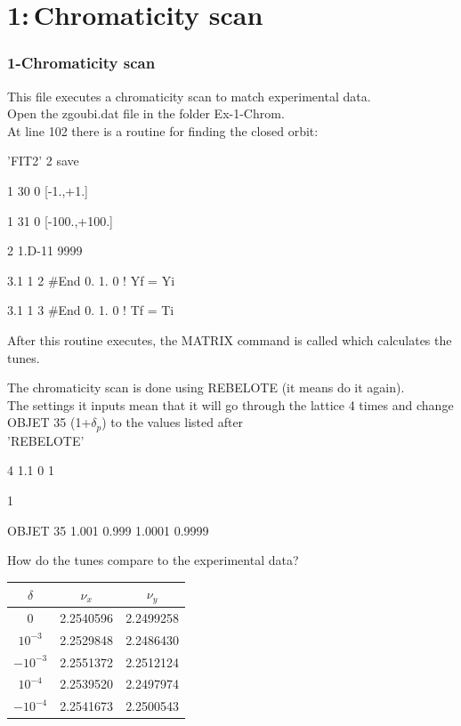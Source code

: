 \documentclass{beamer}
\begin{document}
\section{1:\,Chromaticity scan}
\begin{frame}
\frametitle{1-Chromaticity scan}
This file executes a chromaticity scan to match experimental data.\\
Open the zgoubi.dat file in the folder Ex-1-Chrom.\\
At line 102 there is a routine for finding the closed orbit:
\tiny

 'FIT2'
2  save

1 30 0 [-1.,+1.]

1 31 0 [-100.,+100.]

2  1.D-11  9999

3.1  1  2  \#End 0. 1. 0   ! Yf = Yi

3.1  1  3  \#End 0. 1. 0   ! Tf = Ti

\normalsize
After this routine executes, the MATRIX command is called which calculates the tunes.
\end{frame}
\begin{frame}
The chromaticity scan is done using REBELOTE (it means do it again). \\
The settings it inputs mean that it will go through the lattice 4 times and change OBJET 35 (1+$\delta_p$) to the values listed after\\
\tiny
 'REBELOTE'

4 1.1 0 1

1

OBJET 35  1.001  0.999  1.0001  0.9999

\normalsize
How do the tunes compare to the experimental data?\\
\begin{center}
\begin{tabular}{ccc}
$\delta$  &$\nu_x$  &$\nu_y$\\
\hline
0		  &2.2540596&2.2499258\\
$10^{-3}$ &2.2529848&2.2486430\\
$-10^{-3}$&2.2551372&2.2512124\\
$10^{-4}$ &2.2539520&2.2497974\\
$-10^{-4}$&2.2541673&2.2500543\\
\end{tabular}
\end{center}
\end{frame}
\end{document}
